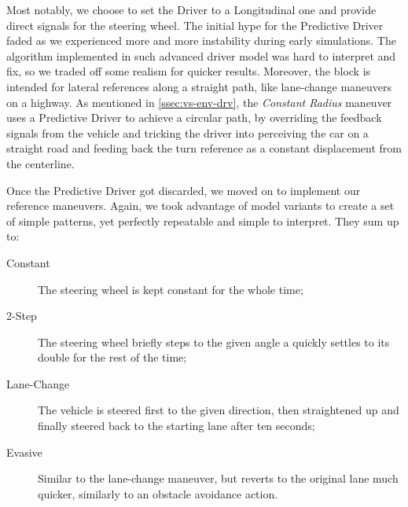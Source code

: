 		Most notably, we choose to set the Driver to a Longitudinal one and provide direct signals for the steering wheel. The initial hype for the Predictive Driver faded as
		we experienced more and more instability during early simulations. The algorithm implemented in such advanced driver model was hard to interpret and fix, so we traded
		off some realism for quicker results. Moreover, the block is intended for lateral references along a straight path, like lane-change maneuvers on a highway.
		As mentioned in \vref{ssec:vs-env-drv}, the \emph{Constant Radius} maneuver uses a Predictive Driver to achieve a circular path, by overriding the feedback signals
		from the vehicle and tricking the driver into perceiving the car on a straight road and feeding back the turn reference as a constant displacement from the centerline.

		Once the Predictive Driver got discarded, we moved on to implement our reference maneuvers. Again, we took advantage of \mwSL{} model variants to create a set of
		simple patterns, yet perfectly repeatable and simple to interpret. They sum up to:
		\begin{description}

			\item[Constant] The steering wheel is kept constant for the whole time;

			\item[2-Step] The steering wheel briefly steps to the given angle a quickly settles to its double for the rest of the time;

			\item[Lane-Change] The vehicle is steered first to the given direction, then straightened up and finally steered back to the starting lane after ten seconds;

			\item[Evasive] Similar to the lane-change maneuver, but reverts to the original lane much quicker, similarly to an obstacle avoidance action.

		\end{description}

